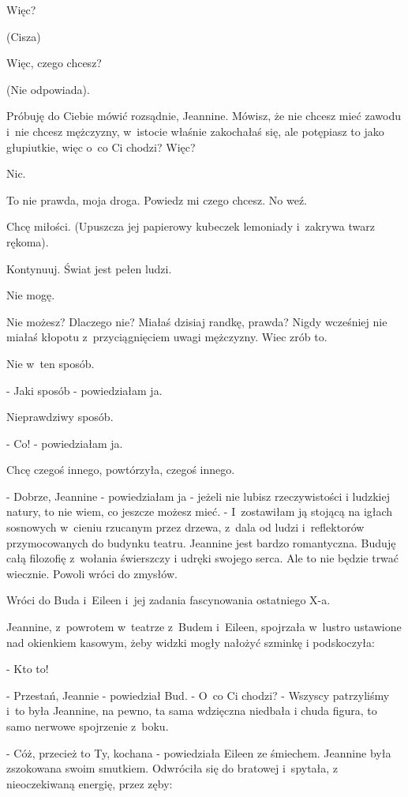 \documentclass[oneside,polish,12pt,sfheadings]{mwbk}
\begin{document}
Więc?

(Cisza)

Więc, czego chcesz?

(Nie odpowiada).

Próbuję do Ciebie mówić rozsądnie, Jeannine. Mówisz, że nie chcesz
mieć zawodu i~nie chcesz mężczyzny, w~istocie właśnie zakochałaś się,
ale potępiasz to jako głupiutkie, więc o~co Ci chodzi? Więc?

Nic.

To nie prawda, moja droga. Powiedz mi czego chcesz. No weź.

Chcę miłości. (Upuszcza jej papierowy kubeczek lemoniady i~zakrywa
twarz rękoma).

Kontynuuj. Świat jest pełen ludzi.

Nie mogę.

Nie możesz? Dlaczego nie? Miałaś dzisiaj randkę, prawda? Nigdy wcześniej
nie miałaś kłopotu z~przyciągnięciem uwagi mężczyzny. Wiec zrób to.

Nie w~ten sposób.

- Jaki sposób - powiedziałam ja.

Nieprawdziwy sposób.

- Co! - powiedziałam ja.

Chcę czegoś innego, powtórzyła, czegoś innego.

- Dobrze, Jeannine - powiedziałam ja - jeżeli nie lubisz rzeczywistości
i ludzkiej natury, to nie wiem, co jeszcze możesz mieć. - I~zostawiłam
ją stojącą na igłach sosnowych w~cieniu rzucanym przez drzewa, z~dala
od ludzi i~reflektorów przymocowanych do budynku teatru. Jeannine
jest bardzo romantyczna. Buduję całą filozofię z~wołania świerszczy
i udręki swojego serca. Ale to nie będzie trwać wiecznie. Powoli wróci
do zmysłów.

Wróci do Buda i~Eileen i~jej zadania fascynowania ostatniego X-a.

Jeannine, z~powrotem w~teatrze z~Budem i~Eileen, spojrzała w~lustro
ustawione nad okienkiem kasowym, żeby widzki mogły nałożyć szminkę
i podskoczyła: 

- Kto to!

- Przestań, Jeannie - powiedział Bud. - O~co Ci chodzi? - Wszyscy
patrzyliśmy i~to była Jeannine, na pewno, ta sama wdzięczna niedbała
i chuda figura, to samo nerwowe spojrzenie z~boku.

- Cóż, przecież to Ty, kochana - powiedziała Eileen ze śmiechem. Jeannine
była zszokowana swoim smutkiem. Odwróciła się do bratowej i~spytała,
z nieoczekiwaną energię, przez zęby: 
\end{document}
